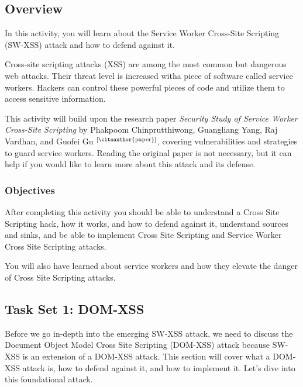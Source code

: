 \documentclass[letterpaper,12pt]{report}
\begin{document}
\subsection*{Overview}\label{sec:work-carried-out}

In this activity, you will learn about the Service Worker Cross-Site Scripting (SW-XSS) attack and how to defend against it.

Cross-site scripting attacks (XSS) are among the most common but dangerous web attacks. Their threat level is increased witha piece of software called service workers. Hackers can control these powerful pieces of code and utilize them to access sensitive information.

This activity will build upon the research paper \emph{Security Study of Service Worker Cross-Site Scripting} by Phakpoom Chinprutthiwong, Guangliang Yang, Raj Vardhan, and Guofei Gu $^{\text{[\citeauthor{paper}]}}$, covering vulnerabilities and strategies to guard service workers. Reading the original paper is not necessary, but it can help if you would like to learn more about this attack and its defense.

\subsubsection*{Objectives}

After completing this activity you should be able to understand a Cross Site Scripting hack, how it works, and how to defend against it, understand sources and sinks, and be able to implement Cross Site Scripting and Service Worker Cross Site Scripting attacks. 

You will also have learned about service workers and how they elevate the danger of Cross Site Scripting attacks.

\subsection*{Task Set 1: DOM-XSS}\label{sec:Task 1: DOMXSS}

Before we go in-depth into the emerging SW-XSS attack, we need to discuss the Document Object Model Cross Site Scripting (DOM-XSS) attack because SW-XSS is an extension of a DOM-XSS attack. This section will cover what a DOM-XSS attack is, how to defend against it, and how to implement it. Let's dive into this foundational attack.
\end{document}
